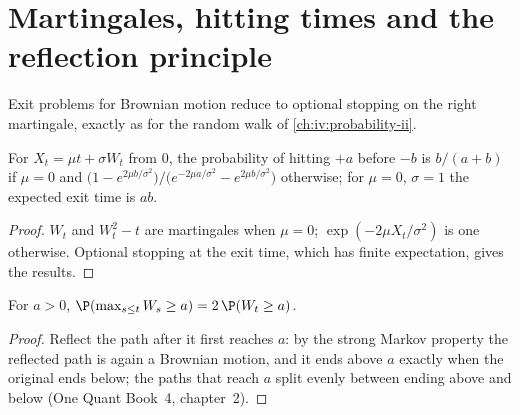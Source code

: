\section{Martingales, hitting times and the reflection principle}

Exit problems for Brownian motion reduce to optional stopping on the right martingale, exactly as for the random walk
of \cref{ch:iv:probability-ii}.

\begin{proposition}\label{prop:iv:stochastic-calculus:exit}
For $X_t = \mu t + \sigma W_t$ from 0, the probability of hitting $+a$ before $-b$ is $b/(a+b)$ if $\mu = 0$ and
$\big(1 - e^{2\mu b/\sigma^2}\big)/\big(e^{-2\mu a/\sigma^2} - e^{2\mu b/\sigma^2}\big)$ otherwise; for $\mu = 0$, $\sigma = 1$
the expected exit time is $ab$.
\end{proposition}

\begin{proof}
$W_t$ and $W_t^2 - t$ are martingales when $\mu = 0$; $\exp(-2\mu X_t/\sigma^2)$ is one otherwise. Optional stopping at the
exit time, which has finite expectation, gives the results.
\end{proof}

\begin{proposition}\label{prop:iv:stochastic-calculus:reflection}
For $a > 0$, $\P(\max_{s \le t} W_s \ge a) = 2\,\P(W_t \ge a)$.
\end{proposition}

\begin{proof}
Reflect the path after it first reaches $a$: by the strong Markov property the reflected path is again a Brownian motion,
and it ends above $a$ exactly when the original ends below; the paths that reach $a$ split evenly between ending above
and below (One Quant Book~4, chapter~2).
\end{proof}

